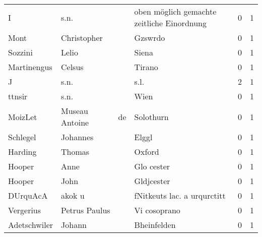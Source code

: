 \begin{center}
\begin{tiny}
\begin{longtabu}{llllrr}
                        I &                               s.n. &             &  oben möglich gemachte zeitliche Einordnung &          0 &         1 \\
                     Mont &                        Christopher &             &                                     Gzswrdo &          0 &         1 \\
                  Sozzini &                              Lelio &             &                                       Siena &          0 &         1 \\
              Martinengus &                             Celsus &             &                                      Tirano &          0 &         1 \\
                        J &                               s.n. &             &                                        s.l. &          2 &         1 \\
                   ttnsir &                               s.n. &             &                                        Wien &          0 &         1 \\
                  MoizLet &                     Museau Antoine &          de &                                   Solothurn &          0 &         1 \\
                 Schlegel &                           Johannes &             &                                       Elggl &          0 &         1 \\
                  Harding &                             Thomas &             &                                      Oxford &          0 &         1 \\
                   Hooper &                               Anne &             &                                  Glo cester &          0 &         1 \\
                   Hooper &                               John &             &                                  Gldjcester &          0 &         1 \\
                 DUrquAcA &                             akok u &             &                 fNitkeuts lac. a urqurctitt &          0 &         1 \\
                Vergerius &                      Petrus Paulus &             &                                Vi cosoprano &          0 &         1 \\
             Adetschwiler &                             Johann &             &                                 Bheinfelden &          0 &         1 \\

\end{longtabu}
\end{tiny}
\end{center}
